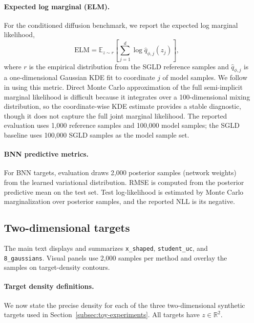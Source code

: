 \paragraph{Expected log marginal (ELM).}
For the conditioned diffusion benchmark, we report the expected log marginal likelihood,
\begin{equation}
  \mathrm{ELM}
  =
  \mathbb{E}_{z \sim r}
  \left[
    \sum_{j=1}^{d}
    \log \widehat{q}_{\phi,j}(z_j)
  \right],
\end{equation}
where $r$ is the empirical distribution from the SGLD reference samples and $\widehat{q}_{\phi,j}$ is a one-dimensional Gaussian KDE fit to coordinate $j$ of model samples.  We follow \citet{pielok2025revisiting} in using this metric.  Direct Monte Carlo approximation of the full semi-implicit marginal likelihood is difficult because it integrates over a 100-dimensional mixing distribution, so the coordinate-wise KDE estimate provides a stable diagnostic, though it does not capture the full joint marginal likelihood. The reported evaluation uses 1,000 reference samples and 100,000 model samples; the SGLD baseline uses 100,000 SGLD samples as the model sample set.

\paragraph{BNN predictive metrics.}
For BNN targets, evaluation draws 2,000 posterior samples (network weights) from the learned variational distribution.  RMSE is computed from the posterior predictive mean on the test set.  Test log-likelihood is estimated by Monte Carlo marginalization over posterior samples, and the reported NLL is its negative.

\subsection{Two-dimensional targets}
\label{app:toy-details}

The main text displays and summarizes \texttt{x\_shaped}, \texttt{student\_uc}, and \texttt{8\_gaussians}. Visual panels use 2,000 samples per method and overlay the samples on target-density contours.

\paragraph{Target density definitions.}
We now state the precise density for each of the three two-dimensional synthetic targets used in Section~\ref{subsec:toy-experiments}.
All targets have $z\in\mathbb{R}^2$.

